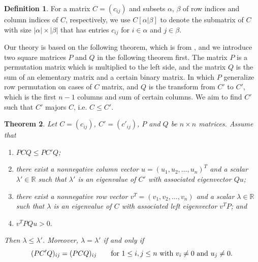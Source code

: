 \documentclass[12pt, a4paper]{article}
\theoremstyle{plain}
\newtheorem{thm}{Theorem}[section]
\theoremstyle{definition}
\newtheorem{defn}[thm]{Definition}
\begin{document}
\begin{defn}
    For a matrix $C=(c_{ij})$ and subsets $\alpha$, $\beta$ of row indices and column
    indices of $C$, respectively, we use $C[\alpha|\beta]$ to denote the
    submatrix of $C$ with size $ |\alpha| \times |\beta| $ that has entries $c_{ij}$ for $i\in \alpha$
    and $j\in\beta$.
\end{defn}

Our theory is based on the following theorem, which is from \cite{chang}, and we introduce two square matrices $P$ and $Q$ in the following theorem first. The matrix $P$ is a permutation matrix which is multiplied to the left side, and the matrix $Q$ is the sum of an elementary matrix and a certain binary matrix. In which $P$ generalize row permutation on cases of $C$ matrix, and $Q$ is the transform from $C'$ to $C'$, which is the first $n-1$ columns and sum of certain columns. We aim to find $C'$ such that $C'$ majors $C$, i.e. $C\leq C'$.

\begin{thm}\label{pre_thm}
    Let $C=(c_{ij})$, $C'=(c'_{ij})$, $P$ and $Q$ be $n\times n$ matrices.
Assume that
\begin{enumerate}[label=(\roman*)]
    \item \label{pre_thm_em1}  $PCQ\leq PC'Q$;
    \item \label{pre_thm_em2} there exist a nonnegative column vector $u=(u_1, u_2, \ldots, u_n)^T$  and a
    scalar $\lambda'\in \mathbb{R}$ such that $\lambda'$ is an eigenvalue of $C'$ with
    associated eigenvector $Qu$;
    \item \label{pre_thm_em3}  there exist a nonnegative row vector $v^T=(v_1, v_2, \ldots, v_n)$  and a scalar
    $\lambda\in \mathbb{R}$such that $\lambda$ is an eigenvalue of $C$ with associated  left
    eigenvector $v^TP$; and
    \item \label{pre_thm_em4} $v^TPQu>0.$
\end{enumerate}
    Then $\lambda\leq \lambda'$. Moreover, $\lambda=\lambda'$ if and only if
    \begin{equation}\label{pre0}
        (PC'Q)_{ij}=(PCQ)_{ij}\qquad \hbox{for~}1\leq i, j\leq n \hbox{~with~} v_i\ne 0 \hbox{~and~} u_j\ne 0.
    \end{equation}
\end{thm}
\end{document}
